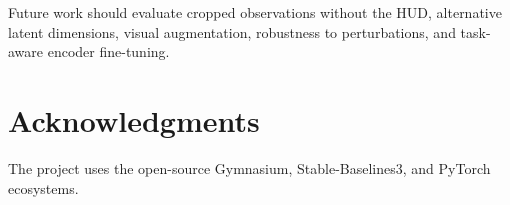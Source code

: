 \documentclass[10pt,twocolumn,a4paper]{article}
\begin{document}
Future work should evaluate cropped observations without the HUD, alternative
latent dimensions, visual augmentation, robustness to perturbations, and
task-aware encoder fine-tuning.

\section*{Acknowledgments}

The project uses the open-source Gymnasium, Stable-Baselines3, and PyTorch
ecosystems.



\end{document}
